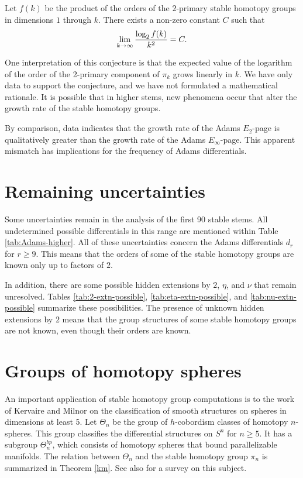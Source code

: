 \begin{conj}
Let $f(k)$ be the product of the orders of the $2$-primary
stable homotopy groups in dimensions $1$ through $k$.
There exists a non-zero constant $C$ such that
\[
\lim_{k \rightarrow \infty} \frac{\log_2 f(k)}{k^2} = C.
\]
\end{conj}

One interpretation of this conjecture is that the expected value of
the logarithm of the order of the 2-primary component of $\pi_k$
grows linearly in $k$.  
We have only data to support the conjecture, and we have not formulated
a mathematical rationale.
It is possible that in higher stems, new phenomena occur that alter the
growth rate of the stable homotopy groups. 

By comparison, data indicates that the growth rate of the
Adams $E_2$-page is qualitatively greater than the growth rate of the
Adams $E_\infty$-page.  This apparent mismatch has implications 
for the frequency of Adams differentials.

\section{Remaining uncertainties}

Some uncertainties remain in the analysis of the first 90 stable stems.
All undetermined possible differentials in this range are mentioned within
Table \ref{tab:Adams-higher}.  
All of these uncertainties concern the Adams differentials $d_r$
for $r \geq 9$.
This means that
the orders of some of the stable homotopy groups are known only up
to factors of $2$.

In addition, there are some possible hidden extensions by $2$, $\eta$,
and $\nu$ that remain unresolved.  Tables \ref{tab:2-extn-possible},
\ref{tab:eta-extn-possible}, and \ref{tab:nu-extn-possible} 
summarize these possibilities.  The presence of
unknown hidden extensions by $2$ means that
the group structures of some stable homotopy groups are not known, 
even though their orders are known.


\section{Groups of homotopy spheres}\label{section homotopy sphere}

An important application of stable homotopy group computations 
is to the work of Kervaire and Milnor \cite{KervaireMilnor}
on the classification of smooth structures on spheres in dimensions at least 5. Let $\Theta_n$ be the group of $h$-cobordism classes of homotopy $n$-spheres. This group classifies the differential structures on $S^n$ for $n\geq5$. It has a subgroup $\Theta_n^{bp}$, which consists of homotopy spheres that bound parallelizable manifolds. The relation between $\Theta_n$ and the stable homotopy group $\pi_n$ 
is summarized in Theorem \ref{km}. See also \cite{Milnor} for a survey on this subject.

